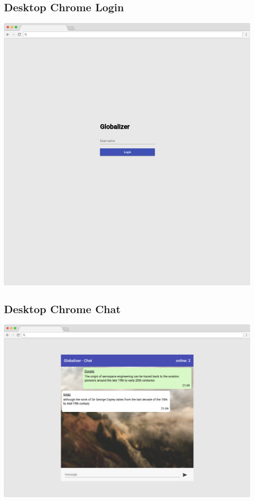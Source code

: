 \documentclass[12pt]{article}
\begin{document}
        \subsection{Desktop Chrome Login}
        \includegraphics[width=\textwidth]{frame-desktop-login.png}
        
        \subsection{Desktop Chrome Chat}
        \includegraphics[width=\textwidth]{frame-desktop-chat.png}
\end{document}
